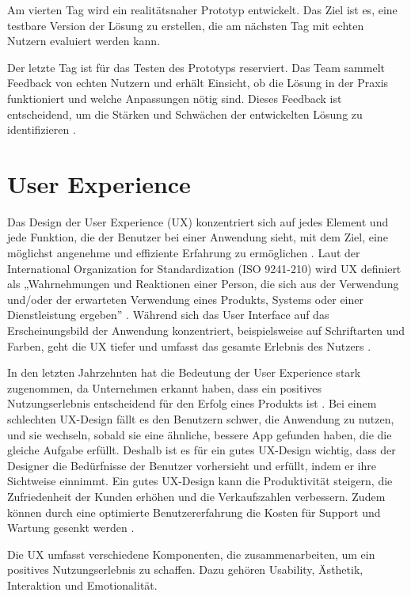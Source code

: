 Am vierten Tag wird ein realitätsnaher Prototyp entwickelt. Das Ziel ist es, eine testbare Version der Lösung zu erstellen, die am nächsten Tag mit echten Nutzern evaluiert werden kann. 

Der letzte Tag ist für das Testen des Prototyps reserviert. Das Team sammelt Feedback von echten Nutzern und erhält Einsicht, ob die Lösung in der Praxis funktioniert und welche Anpassungen nötig sind. Dieses Feedback ist entscheidend, um die Stärken und Schwächen der entwickelten Lösung zu identifizieren \cite[S.22 ff.]{Design_Sprint}.

\section{User Experience}
Das Design der User Experience (UX) konzentriert sich auf jedes Element und jede Funktion, die der Benutzer bei einer Anwendung sieht, mit dem Ziel, eine möglichst angenehme und effiziente Erfahrung zu ermöglichen \cite[S.12]{Bordegoni}. 
Laut der International Organization for Standardization (ISO 9241-210) wird UX definiert als „Wahrnehmungen und Reaktionen einer Person, die sich aus der Verwendung und/oder der erwarteten Verwendung eines Produkts, Systems oder einer Dienstleistung ergeben” \cite{iso}. 
Während sich das User Interface auf das Erscheinungsbild der Anwendung konzentriert, beispielsweise auf Schriftarten und Farben, geht die UX tiefer und umfasst das gesamte Erlebnis des Nutzers \cite[S.8]{Canziba}.

In den letzten Jahrzehnten hat die Bedeutung der User Experience stark zugenommen, da Unternehmen erkannt haben, dass ein positives Nutzungserlebnis entscheidend für den Erfolg eines Produkts ist \cite{ux_article}. 
Bei einem schlechten UX-Design fällt es den Benutzern schwer, die Anwendung zu nutzen, und sie wechseln, sobald sie eine ähnliche, bessere App gefunden haben, die die gleiche Aufgabe erfüllt. 
Deshalb ist es für ein gutes UX-Design wichtig, dass der Designer die Bedürfnisse der Benutzer vorhersieht und erfüllt, indem er ihre Sichtweise einnimmt. Ein gutes UX-Design kann die Produktivität steigern, die Zufriedenheit der Kunden erhöhen und die Verkaufszahlen verbessern. 
Zudem können durch eine optimierte Benutzererfahrung die Kosten für Support und Wartung gesenkt werden \cite[S.8 ff.]{Canziba}.

Die UX umfasst verschiedene Komponenten, die zusammenarbeiten, um ein positives Nutzungserlebnis zu schaffen. Dazu gehören Usability, Ästhetik, Interaktion und Emotionalität.

